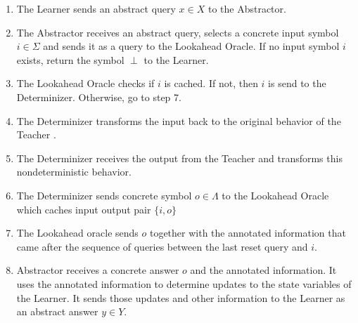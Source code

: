 \documentclass[multi,crop=false,class=article]{standalone}
\begin{document}
\begin{enumerate}
	\item The Learner sends an abstract query $x \in X$ to the Abstractor.
	\item The Abstractor receives an abstract query, selects a concrete input
	symbol $i \in \Sigma$ and sends it as a query to the Lookahead 
	Oracle\cite{Tomte2014}. If no input symbol $i$ exists, return the symbol 
	$\perp$ to the Learner.
	\item The Lookahead Oracle checks if $i$ is cached. If not, then $i$ is send
	to the Determinizer. Otherwise, go to step 7.
	\item The Determinizer transforms the input back to the original behavior of
	the Teacher \cite{Aarts2015}.
	\item The Determinizer receives the output from the Teacher and transforms 
	this nondeterministic behavior.
	\item The Determinizer sends concrete symbol $o \in \Lambda$ to the 
	Lookahead 
	Oracle which caches input output pair $\{i,o\}$
	\item The Lookahead oracle sends $o$ together with the annotated information
	that came after the sequence of queries between the last reset query and
	$i$.
	\item Abstractor receives a concrete answer $o$ and the annotated
	information. It uses the annotated information to determine updates to the
	state variables of the Learner. It sends those updates and other
	information to the Learner as an abstract answer $y \in Y$.
\end{enumerate}
\end{document}
